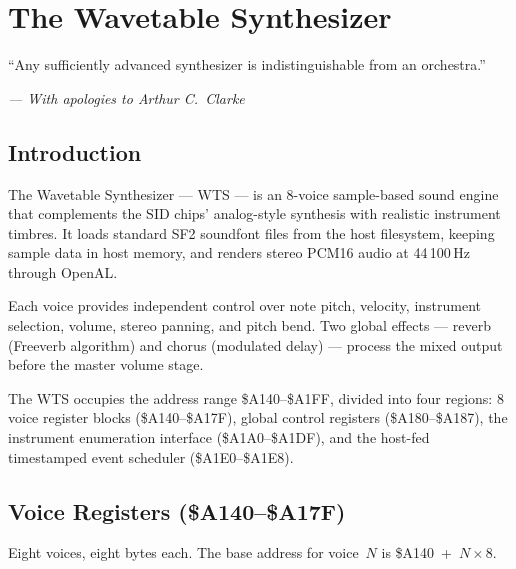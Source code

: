 \chapter{The Wavetable Synthesizer}

\epigraph{``Any sufficiently advanced synthesizer is indistinguishable from an
orchestra.''}{\textit{--- With apologies to Arthur C.\ Clarke}}

\section*{Introduction}

The Wavetable Synthesizer --- WTS --- is an 8-voice sample-based sound engine
that complements the SID chips' analog-style synthesis with realistic instrument
timbres.  It loads standard SF2 soundfont files from the host filesystem,
keeping sample data in host memory, and renders stereo PCM16 audio at
44\,100\,Hz through OpenAL.

Each voice provides independent control over note pitch, velocity, instrument
selection, volume, stereo panning, and pitch bend.  Two global effects ---
reverb (Freeverb algorithm) and chorus (modulated delay) --- process the mixed
output before the master volume stage.

The WTS occupies the address range \$A140--\$A1FF, divided into four regions:
8 voice register blocks (\$A140--\$A17F), global control registers
(\$A180--\$A187), the instrument enumeration interface (\$A1A0--\$A1DF),
and the host-fed timestamped event scheduler (\$A1E0--\$A1E8).


\section{Voice Registers (\$A140--\$A17F)}
\label{sec:wts-voices}

Eight voices, eight bytes each.  The base address for voice~$N$ is
\$A140~+~$N \times 8$.

